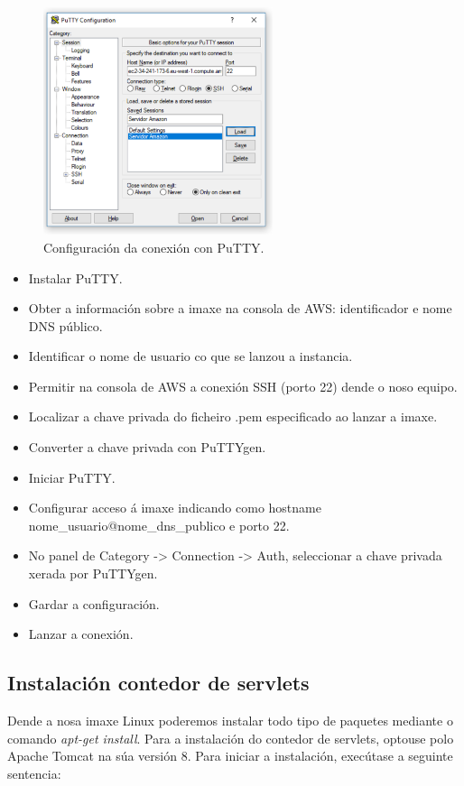 \begin{figure}[h]
	\begin{center}
		\includegraphics[width=0.6\textwidth]{figures/capturas/putty}
		\caption{Configuración da conexión con PuTTY.}
		\label{fig:putty}
	\end{center}
\end{figure}

\begin{itemize}
	\item Instalar PuTTY.
	\item Obter a información sobre a imaxe na consola de AWS: identificador e nome DNS público.
	\item Identificar o nome de usuario co que se lanzou a instancia.
	\item Permitir na consola de AWS a conexión SSH (porto 22) dende o noso equipo.
	\item Localizar a chave privada do ficheiro .pem especificado ao lanzar a imaxe.
	\item Converter a chave privada con PuTTYgen.
	\item Iniciar PuTTY.
	\item Configurar acceso á imaxe indicando como hostname nome\_usuario@nome\_dns\_publico e porto 22.
	\item No panel de Category -> Connection -> Auth, seleccionar a chave privada xerada por PuTTYgen.
	\item Gardar a configuración.
	\item Lanzar a conexión.
\end{itemize}

\subsection{Instalación contedor de servlets}
Dende a nosa imaxe Linux poderemos instalar todo tipo de paquetes mediante o comando \emph{apt-get install}. Para a instalación do contedor de servlets, optouse polo Apache Tomcat na súa versión 8. Para iniciar a instalación, execútase a seguinte sentencia:

